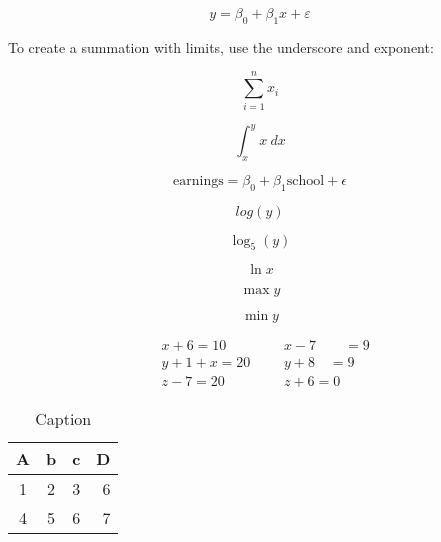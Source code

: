 \documentclass[12pt]{article} %
\begin{document}
\begin{equation*}
     y = \beta_0 + \beta_1 x + \varepsilon
\end{equation*}

To create a summation with limits, use the underscore and exponent:

$$ \sum_{i=1}^n x_i $$

$$\int_{x}^{y} x \ dx$$

\begin{equation}
    \text{earnings} = \beta_0 + \beta_1 \text{school} + \epsilon 
\end{equation}

$$log(y)$$

$$\log_5(y)$$

$$\ln x$$

$$ \max {y} $$

$$ \min{y} $$

\begin{align*}
&x + 6 = 10  && &x - 7 \qquad  = 9\\ 
&y + 1 + x= 20  && &y + 8  \quad = 9\\
&z - 7  = 20 && &z + 6  = 0
\end{align*}


\begin{table}[h]
    \centering
    \begin{tabular}{cccr}
    \toprule
        A & b & c & D \\
    \midrule
        1 & 2 & 3 & 6 \\
        4 & 5 & 6 & 7 \\
    \bottomrule
    \end{tabular}
    \caption{Caption}
    \label{tab:my_label}
\end{table}
\end{document}
